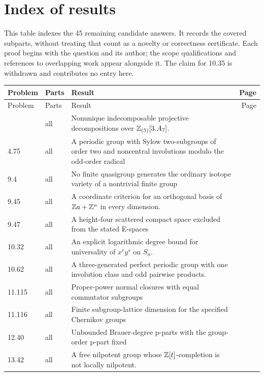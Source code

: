 \section{Index of results}\label{app:inventory}
This table indexes the 45 remaining candidate answers. It records the
covered subparts, without treating that count as a novelty or correctness
certificate. Each proof begins with the question and its author; the
scope qualifications and references to overlapping work appear alongside
it. The claim for 10.35 is withdrawn and contributes no entry here.
\small
\begin{longtable}{@{}p{}p{}>{\raggedright\arraybackslash}p{}r@{}}
\toprule Problem & Parts & Result & Page\\\midrule\endfirsthead
\toprule Problem & Parts & Result & Page\\\midrule\endhead
\bottomrule\endfoot
4.55 & all & Nonunique indecomposable projective decompositions over $\mathbb Z_{(5)}[3.A_7]$. & \pageref{cand:4.55} \\
4.75 & all & A periodic group with Sylow two-subgroups of order two and noncentral involutions modulo the odd-order radical & \pageref{cand:4.75} \\
9.4 & all & No finite quasigroup generates the ordinary isotope variety of a nontrivial finite group & \pageref{cand:9.4} \\
9.45 & all & A coordinate criterion for an orthogonal basis of $\mathbb Z a+\mathbb Z^n$ in every dimension. & \pageref{cand:9.45} \\
9.47 & all & A height-four scattered compact space excluded from the stated E-spaces & \pageref{cand:9.47} \\
10.32 & all & An explicit logarithmic degree bound for universality of $x^ry^s$ on $S_n$. & \pageref{cand:10.32} \\
10.62 & all & A three-generated perfect periodic group with one involution class and odd pairwise products. & \pageref{cand:10.62} \\
11.115 & all & Proper-power normal closures with equal commutator subgroups & \pageref{cand:11.115} \\
11.116 & all & Finite subgroup-lattice dimension for the specified Chernikov groups & \pageref{cand:11.116} \\
12.40 & all & Unbounded Brauer-degree p-parts with the group-order p-part fixed & \pageref{cand:12.40} \\
13.42 & all & A free nilpotent group whose $\mathbb Z[t]$-completion is not locally nilpotent. & \pageref{cand:13.42} \\

\end{longtable}
